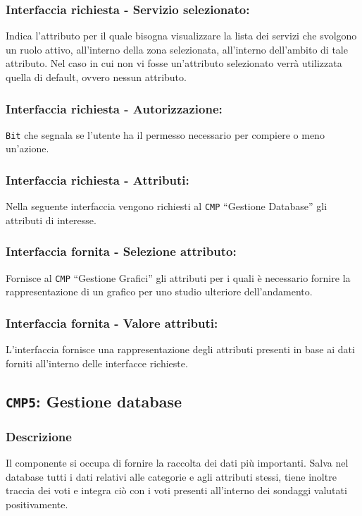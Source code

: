         \subsubsection{Interfaccia richiesta - Servizio selezionato:}
            Indica l'attributo per il quale bisogna visualizzare la lista dei servizi che svolgono un ruolo attivo, all'interno della zona selezionata, all'interno dell'ambito di tale attributo. Nel caso in cui non vi fosse un'attributo selezionato verrà utilizzata quella di default, ovvero nessun attributo.
        \subsubsection{Interfaccia richiesta - Autorizzazione:}
            \texttt{Bit} che segnala se l'utente ha il permesso necessario per compiere o meno un'azione.
        \subsubsection{Interfaccia richiesta - Attributi:}
            Nella seguente interfaccia vengono richiesti al \texttt{CMP} ``Gestione Database'' gli attributi di  interesse.
        \subsubsection{Interfaccia fornita - Selezione attributo:}
            Fornisce al \texttt{CMP} ``Gestione Grafici'' gli attributi per i quali è necessario fornire la rappresentazione di un grafico per uno studio ulteriore dell'andamento.
        \subsubsection{Interfaccia fornita - Valore attributi:}
            L'interfaccia fornisce una rappresentazione degli attributi presenti in base ai dati forniti all'interno delle interfacce richieste.

    \subsection{\texttt{CMP5}: Gestione database}
        \subsubsection{Descrizione} 
            Il componente si occupa di fornire la raccolta dei dati più importanti. Salva nel database tutti i dati relativi alle categorie e agli attributi stessi, tiene inoltre traccia dei voti e integra ciò con i voti presenti all'interno dei sondaggi valutati positivamente.
